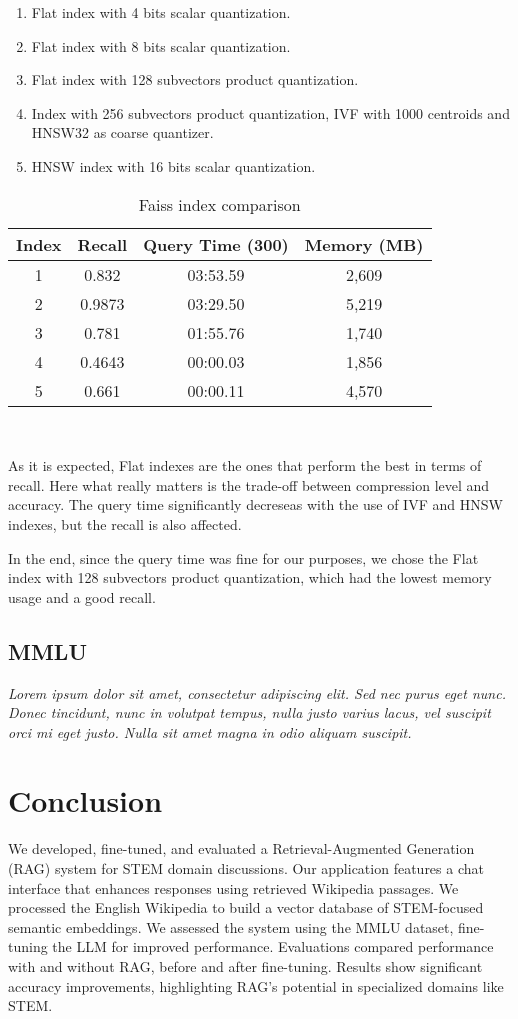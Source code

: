 \documentclass[11pt]{article}
\begin{document}
\begin{enumerate}
    \item Flat index with 4 bits scalar quantization.
    \item Flat index with 8 bits scalar quantization.
    \item Flat index with 128 subvectors product quantization. 
    \item Index with 256 subvectors product quantization, IVF with 1000 centroids
    and HNSW32 as coarse quantizer.
    \item HNSW index with 16 bits scalar quantization.
\end{enumerate}

\begin{table}[h]
\centering
\begin{tabular}{|c|c|c|c|}
\hline
Index & Recall & Query Time (300) & Memory (MB) \\
\hline
1 & 0.832 & 03:53.59 & 2,609 \\
2 & 0.9873 & 03:29.50 & 5,219 \\
3 & 0.781 & 01:55.76 & 1,740 \\
4 & 0.4643 & 00:00.03 & 1,856 \\
5 & 0.661 & 00:00.11 & 4,570 \\
\hline
\end{tabular}
\caption{Faiss index comparison}
\
\label{tab:faiss-index}
\end{table}

As it is expected, Flat indexes are the ones that perform the best in terms of recall.
Here what really matters is the trade-off between compression level and accuracy.
The query time significantly decreseas with the use of IVF and HNSW indexes, but the recall
is also affected.

In the end, since the query time was fine for our purposes, we chose the Flat index with 128
subvectors product quantization, which had the lowest memory usage and a good recall.


\subsection{MMLU}
\textit{Lorem ipsum dolor sit amet, consectetur adipiscing elit. Sed nec purus eget
nunc. Donec tincidunt, nunc in volutpat tempus, nulla justo varius lacus, vel
suscipit orci mi eget justo. Nulla sit amet magna in odio aliquam suscipit.}

\section{Conclusion}
We developed, fine-tuned, and evaluated a Retrieval-Augmented Generation (RAG) 
system for STEM domain discussions. Our application features a chat interface 
that enhances responses using retrieved Wikipedia passages. We processed the 
English Wikipedia to build a vector database of STEM-focused semantic 
embeddings. 
We assessed the system using the MMLU 
dataset, fine-tuning the LLM for improved performance. Evaluations compared 
performance with and without RAG, before and after fine-tuning.
Results show significant accuracy improvements, highlighting RAG's potential 
in specialized domains like STEM.
\end{document}
